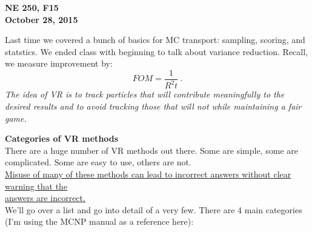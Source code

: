 \documentclass[12pt]{article}
\begin{document}
\begin{center}
{\bf NE 250, F15\\
October 28, 2015 
}
\end{center}

Last time we covered a bunch of basics for MC transport: sampling, scoring, and statstics. We ended class with beginning to talk about variance reduction. Recall, we measure improvement by:
\[
FOM =\frac{1}{R^2 t}\:.
\]
\textit{The idea of VR is to track particles that will contribute meaningfully to the desired results and to avoid tracking those that will not while maintaining a fair game.}

\textbf{Categories of VR methods}\\
There are a huge number of VR methods out there. Some are simple, some are complicated. Some are easy to use, others are not. \\
\underline{Misuse of many of these methods can lead to incorrect answers without clear warning that the} \\\underline{answers are incorrect.}\\
We'll go over a list and go into detail of a very few. There are 4 main categories (I'm using the MCNP manual as a reference here):
%
\end{document}
